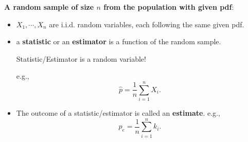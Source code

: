 \begin{frame}

{\bf A random sample of size $n$ from the population with given pdf}: \\[1em]

\begin{itemize}
 \item $X_1, \cdots, X_n$ are i.i.d. random variables, each following the same given pdf.
 \vfill
 \item a {\bf statistic} or an {\bf estimator} is a function of the random sample. \\
 \begin{center}
  \alert{Statistic/Estimator is a random variable!}
 \end{center}
 e.g.,
 \[
 \widehat{p} = \frac{1}{n} \sum_{i=1}^n X_i.
 \]
 \vfill
 \item The outcome of a statistic/estimator is called an {\bf estimate}. e.g.,
 \[
 p_e = \frac{1}{n} \sum_{i=1}^n k_i.
 \]
\end{itemize}
\end{frame}
